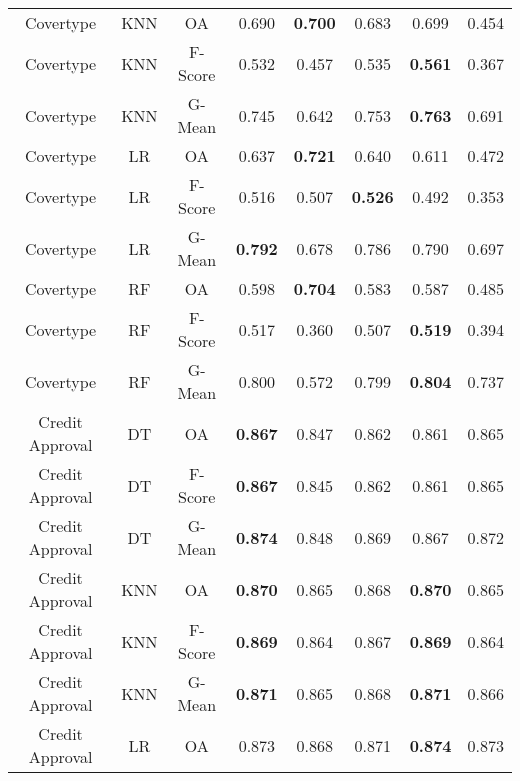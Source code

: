 \begin{longtable}{cccccccc}
         Covertype &        KNN &      OA &          0.690 & \textbf{0.700} &          0.683 &          0.699 &          0.454 \\
         Covertype &        KNN & F-Score &          0.532 &          0.457 &          0.535 & \textbf{0.561} &          0.367 \\
         Covertype &        KNN &  G-Mean &          0.745 &          0.642 &          0.753 & \textbf{0.763} &          0.691 \\
         Covertype &         LR &      OA &          0.637 & \textbf{0.721} &          0.640 &          0.611 &          0.472 \\
         Covertype &         LR & F-Score &          0.516 &          0.507 & \textbf{0.526} &          0.492 &          0.353 \\
         Covertype &         LR &  G-Mean & \textbf{0.792} &          0.678 &          0.786 &          0.790 &          0.697 \\
         Covertype &         RF &      OA &          0.598 & \textbf{0.704} &          0.583 &          0.587 &          0.485 \\
         Covertype &         RF & F-Score &          0.517 &          0.360 &          0.507 & \textbf{0.519} &          0.394 \\
         Covertype &         RF &  G-Mean &          0.800 &          0.572 &          0.799 & \textbf{0.804} &          0.737 \\
   Credit Approval &         DT &      OA & \textbf{0.867} &          0.847 &          0.862 &          0.861 &          0.865 \\
   Credit Approval &         DT & F-Score & \textbf{0.867} &          0.845 &          0.862 &          0.861 &          0.865 \\
   Credit Approval &         DT &  G-Mean & \textbf{0.874} &          0.848 &          0.869 &          0.867 &          0.872 \\
   Credit Approval &        KNN &      OA & \textbf{0.870} &          0.865 &          0.868 & \textbf{0.870} &          0.865 \\
   Credit Approval &        KNN & F-Score & \textbf{0.869} &          0.864 &          0.867 & \textbf{0.869} &          0.864 \\
   Credit Approval &        KNN &  G-Mean & \textbf{0.871} &          0.865 &          0.868 & \textbf{0.871} &          0.866 \\
   Credit Approval &         LR &      OA &          0.873 &          0.868 &          0.871 & \textbf{0.874} &          0.873 \\

\end{longtable}
